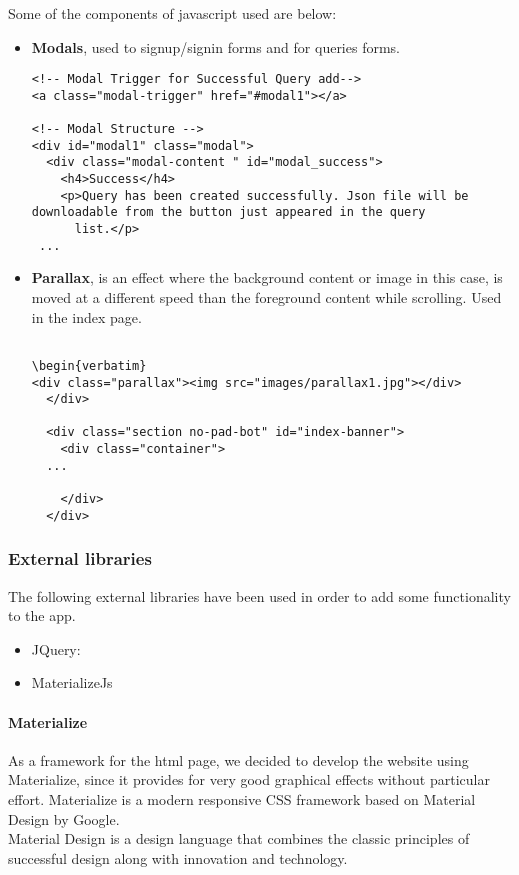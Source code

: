 \noindent Some of the components of javascript used are below:

\begin{itemize}
    \item \textbf{Modals}, used to signup/signin forms and for queries forms.
\begin{verbatim}
<!-- Modal Trigger for Successful Query add-->
<a class="modal-trigger" href="#modal1"></a>

<!-- Modal Structure -->
<div id="modal1" class="modal">
  <div class="modal-content " id="modal_success">
    <h4>Success</h4>
    <p>Query has been created successfully. Json file will be downloadable from the button just appeared in the query
      list.</p>
 ...
\end{verbatim}
    \item \textbf{Parallax}, is an effect where the background content or image in this case, is moved at a different speed than the foreground content while scrolling. Used in the index page.
\begin{verbatim}
    
\begin{verbatim}
<div class="parallax"><img src="images/parallax1.jpg"></div>
  </div>

  <div class="section no-pad-bot" id="index-banner">
    <div class="container">
  ...

    </div>
  </div> 
\end{verbatim}
\end{itemize}

\subsubsection{External libraries}
The following external libraries have been used in order to add some functionality to the app. 
\begin{itemize}
    \item JQuery: 
    \item MaterializeJs
\end{itemize}

\paragraph{Materialize}
As a framework for the html page, we decided to develop the website using Materialize, since it provides for very good graphical effects without particular effort.
Materialize is a modern responsive CSS framework based on Material Design by Google. \\
Material Design is a design language that combines the classic principles of successful design along with innovation and technology.


